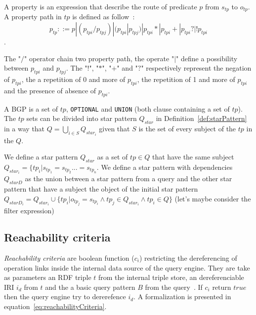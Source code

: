 \begin{definition}\label{def:propertyPath}
   A property is an expression that describe the route of predicate $p$ from $s_{tp}$ to $o_{tp}$.
   A property path in $tp$ is defined as follow~:
   $$p_{tp} ::= p | (p_{tpi}/p_{tpj}) | (p_{tpi}|p_{tpj}) | p_{tpi}* | p_{tpi}+ | p_{tpi}? | !p_{tpi}$$.

   The "$/$" operator chain two property path, the operate "$|$" define a possibility between $p_{tpi}$ and $p_{tpj}$.
   The "$!$", "$*$", "$+$" and "$?$" respectively represent the negation of $p_{tpi}$, the a repetition of 0 and more of $p_{tpi}$, 
   the repetition of 1 and more of $p_{tpi}$ and the presence of absence of $p_{tpi}$.
\end{definition}

\begin{definition}[BGP]\label{def:bgp}
 A BGP is a set of $tp$, \texttt{OPTIONAL} and \texttt{UNION} (both clause containing a set of $tp$).
 The $tp$ sets can be divided into star pattern $Q_{star}$ in Definition~\ref{def:starPattern} in a way 
 that $Q = \bigcup_{i\in S} Q_{star_i}$ given that $S$ is the set of every subject of the $tp$ in the $Q$.
\end{definition}


\begin{definition}\label{def:starPattern}
We define a star pattern $Q_{star}$ as a set of $tp \in Q$ that have the same subject $Q_{star_i} = \{ tp_i| s_{tp_1} = s_{tp_2} ... = s_{tp_n}$.
We define a star pattern with dependencies $Q_{starD}$ as the union between a star pattern from a query and the other star pattern that have a subject
the object of the initial star pattern $Q_{starD_i} = Q_{star_i} \cup \{tp_i| o_{tp_j} = s_{tp_i} \land tp_j \in Q_{star_i} \land tp_i \in Q \}$
(let's maybe consider the filter expression)
\end{definition}

\subsection{Reachability criteria}

\emph{Reachability criteria} are boolean function ($c_i$) restricting the dereferencing of operation links inside the internal data source of the query engine.
They are take as parameters an RDF triple $t$ from the internal triple store, an dereferenciable IRI $i_d$ from $t$ and the a basic query pattern $B$ from the query~\cite{Hartig2012}.
If $c_i$ return $true$ then the query engine try to dererefence $i_d$.
A formalization is presented in equation~\ref{eq:reachabilityCriteria}.


